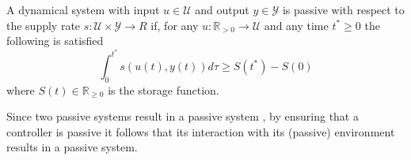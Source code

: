 \begin{definition} \label{def:passivity}
	A dynamical system with input $ u \in \mathcal{U}$ and output $y \in \mathcal{Y}$ is passive with respect to the supply rate $s : \mathcal{U} \times \mathcal{Y} \rightarrow{R}$ if, for any $u: \mathbb{R}_{>0} \rightarrow \mathcal{U}$ and any time $t^* \geq 0$ the following is satisfied
  \begin{equation}
	  \int_0^{t^*} s \left( u(t),  y (t) \right) d \tau \geq S(t^*) - S(0) 
  \end{equation}
  where $S(t) \in \mathbb{R}_{\geq 0}$ is the storage function.
\end{definition}

Since two passive systems result in a passive system \cite{sepulchre2012constructive}, by ensuring that a controller is passive it follows that its interaction with its (passive) environment results in a passive system.
